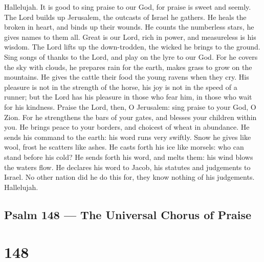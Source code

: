  Hallelujah. It is good to sing praise to our God, for
praise is sweet and seemly.  The Lord builds up Jerusalem,
the outcasts of Israel he gathers.  He heals the broken in
heart, and binds up their wounds.  He counts the numberless
stars, he gives names to them all.  Great is our Lord, rich
in power, and measureless is his wisdom.  The Lord lifts up
the down-trodden, the wicked he brings to the ground.  Sing
songs of thanks to the Lord, and play on the lyre to our God.
 For he covers the sky with clouds, he prepares rain for the
earth, makes grass to grow on the mountains.  He gives the
cattle their food the young ravens when they cry.  His
pleasure is not in the strength of the horse, his joy is not in the
speed of a runner;  but the Lord has his pleasure in those
who fear him, in those who wait for his kindness.  Praise
the Lord, then, O Jerusalem: sing praise to your God, O Zion.
 For he strengthens the bars of your gates, and blesses
your children within you.  He brings peace to your borders,
and choicest of wheat in abundance.  He sends his command
to the earth: his word runs very swiftly.  Snow he gives
like wool, frost he scatters like ashes.  He casts forth
his ice like morsels: who can stand before his cold?  He
sends forth his word, and melts them: his wind blows the waters flow.
 He declares his word to Jacob, his statutes and judgements
to Israel.  No other nation did he do this for, they know
nothing of his judgements. Hallelujah.

\hypertarget{psalm-148-the-universal-chorus-of-praise}{%
\subsection{Psalm 148 --- The Universal Chorus of
Praise}\label{psalm-148-the-universal-chorus-of-praise}}

\hypertarget{section-147}{%
\section{148}\label{section-147}}

